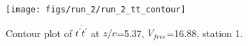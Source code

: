 \begin{figure}[H]
\centering
\texttt{[image: figs/run\_2/run\_2\_tt\_contour]}
\caption{Contour plot of $\overline{t^\prime t^\prime}$ at $z/c$=5.37, $V_{free}$=16.88, station 1.}
\label{fig:run_2_tt_contour}
\end{figure}


